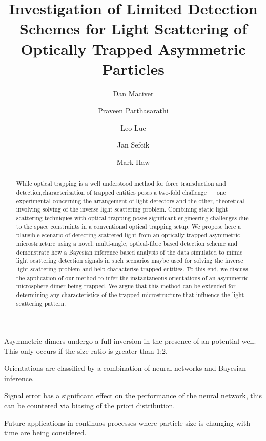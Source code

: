 \documentclass[final,  3p]{elsarticle}
\begin{document}
\begin{frontmatter}

\title{Investigation of Limited Detection Schemes for Light Scattering of Optically Trapped Asymmetric Particles}


\author[aff1]{Dan Maciver} 

\author[aff1]{Praveen Parthasarathi}

\author[aff1]{Leo Lue}

\author[aff1]{Jan Sefcik}

\author[aff1]{Mark Haw}






\begin{abstract}
  While optical trapping is a well understood method for force
  transduction and detection,characterisation of trapped entities
  poses a two-fold challenge --- one experimental concerning the
  arrangement of light detectors and the other, theoretical involving
  solving of the inverse light scattering problem. Combining static
  light scattering techniques with optical trapping poses significant
  engineering challenges due to the space constraints in a
  conventional optical trapping setup.  We propose here a plausible
  scenario of detecting scattered light from an optically trapped
  asymmetric microstructure using a novel, multi-angle, optical-fibre
  based detection scheme and demonstrate how a Bayesian inference
  based analysis of the data simulated to mimic light scattering
  detection signals in such scenarios maybe used for solving the
  inverse light scattering problem and help characterise trapped
  entities.  To this end, we discuss the application of our method to
  infer the instantaneous orientations of an asymmetric microsphere
  dimer being trapped. We argue that this method can be extended for
  determining any characteristics of the trapped microstructure that
  influence the light scattering pattern.
\end{abstract}

\begin{highlights}
\item Asymmetric dimers undergo a full inversion in the presence of an potential well. This only occurs if the size ratio is greater than 1:2.  
\item Orientations are classified by a combination of neural networks and Bayesian inference. 
\item Signal error has a significant effect on the performance of the neural network, this can be countered via biasing of the priori distribution. 
\item Future applications in continuos processes where particle size is changing with time are being considered.  
\end{highlights}


\end{frontmatter}
\end{document}
